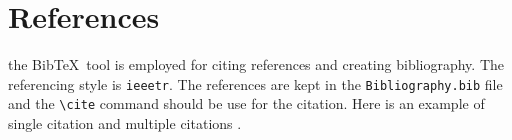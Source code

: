 \chapter{References}

the {\sc Bib}\TeX\ tool is employed for citing references and creating bibliography. The referencing style is \verb|ieeetr|. The references are kept in the \verb|Bibliography.bib| file and the \verb|\cite| command should be use for the citation. Here is an example of single citation \cite{einstein} and multiple citations \cite{latexcompanion,knuthwebsite}.

